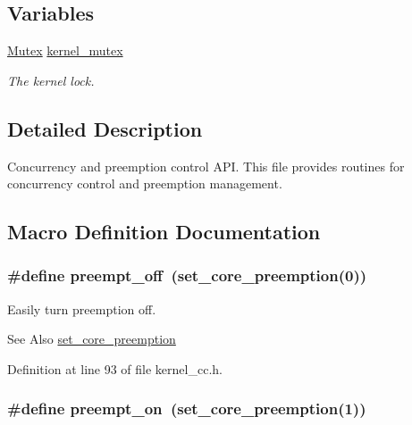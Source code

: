 \subsection*{Variables}
\begin{DoxyCompactItemize}
\item 
\hyperlink{group__syscalls_gaef2ec62cae8e0031fd19fc8b91083ade}{Mutex} \hyperlink{group__cc_ga57ffb2dcd44b56da47dc03b2f85d9480}{kernel\-\_\-mutex}
\begin{DoxyCompactList}\small\item\em The kernel lock. \end{DoxyCompactList}\end{DoxyCompactItemize}


\subsection{Detailed Description}
Concurrency and preemption control A\-P\-I. This file provides routines for concurrency control and preemption management. 

\subsection{Macro Definition Documentation}
\hypertarget{group__cc_gaf936bcf607a61848cfea21c119f30905}{
\subsubsection[{preempt\-\_\-off}]{\setlength{\rightskip}{0pt plus 5cm}\#define preempt\-\_\-off~({\bf set\-\_\-core\-\_\-preemption}(0))}}\label{group__cc_gaf936bcf607a61848cfea21c119f30905}


Easily turn preemption off. 

\begin{DoxySeeAlso}{See Also}
\hyperlink{group__cc_ga6121802a0b64aae83288f60bf8a76834}{set\-\_\-core\-\_\-preemption} 
\end{DoxySeeAlso}


Definition at line 93 of file kernel\-\_\-cc.\-h.

\hypertarget{group__cc_gac8efed506a60c7c6f02514e878a4004b}{
\subsubsection[{preempt\-\_\-on}]{\setlength{\rightskip}{0pt plus 5cm}\#define preempt\-\_\-on~({\bf set\-\_\-core\-\_\-preemption}(1))}}\label{group__cc_gac8efed506a60c7c6f02514e878a4004b}


